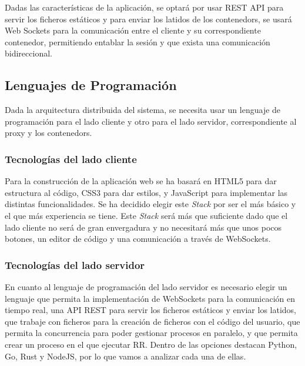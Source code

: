 Dadas las características de la aplicación, se optará por usar REST API para servir los ficheros estáticos y para enviar los latidos de los \glspl{contenedor}, se usará Web Sockets para la comunicación entre el cliente y su correspondiente contenedor, permitiendo entablar la sesión y que exista una comunicación bidireccional. 

\subsection{Lenguajes de Programación} \label{sec:programacion}

Dada la arquitectura distribuida del sistema, se necesita usar un lenguaje de programación para el lado cliente y otro para el lado servidor, correspondiente al proxy y los \glspl{contenedor}.

\subsubsection{Tecnologías del lado cliente} \label{subsubsec:tecnologias-cliente}

Para la construcción de la aplicación web se ha basará en HTML5 para dar estructura al código, CSS3 para dar estilos, y JavaScript para implementar las distintas funcionalidades. Se ha decidido elegir este \textit{Stack} por ser el más básico y el que más experiencia se tiene. Este \textit{Stack} será más que suficiente dado que el lado cliente no será de gran envergadura y no necesitará más que unos pocos botones, un editor de código y una comunicación a través de WebSockets.


\subsubsection{Tecnologías del lado servidor} \label{sec:tecnologias-servidor}

En cuanto al lenguaje de programación del lado servidor es necesario elegir un lenguaje que permita la implementación de WebSockets para la comunicación en tiempo real, una API REST para servir los ficheros estáticos y enviar los latidos, que trabaje con ficheros para la creación de ficheros con el código del usuario, que permita la concurrencia para poder gestionar procesos en paralelo, y que permita crear un proceso en el que ejecutar RR.
Dentro de las opciones destacan Python, Go, Rust y NodeJS, por lo que vamos a analizar cada una de ellas.

